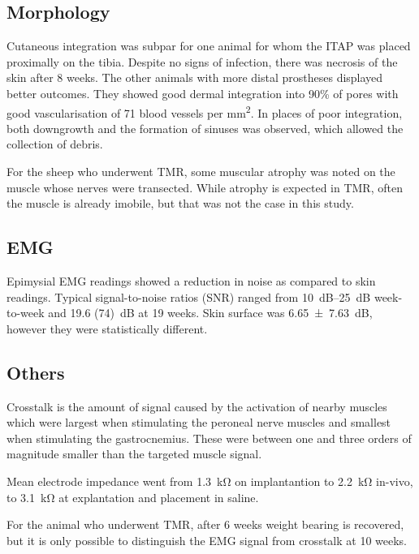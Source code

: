 \subsection{Morphology}
Cutaneous integration was subpar for one animal for whom the ITAP was placed proximally on the tibia.
Despite no signs of infection, there was necrosis of the skin after 8 weeks.
The other animals with more distal prostheses displayed better outcomes.
They showed good dermal integration into 90\% of pores with good vascularisation of 71 blood vessels per \si{\milli\metre\squared}.
In places of poor integration, both downgrowth and the formation of sinuses was observed, which allowed the collection of debris.

For the sheep who underwent TMR, some muscular atrophy was noted on the muscle whose nerves were transected. While atrophy is expected in TMR, often the muscle is already imobile, but that was not the case in this study.

\subsection{EMG}
Epimysial EMG readings showed a reduction in noise as compared to skin readings. Typical signal-to-noise ratios (SNR) ranged from \SIrange{10}{25}{\deci\bel} week-to-week and \SI{19.6 (74)}{\deci\bel} at 19 weeks.
Skin surface was \SI{6.65(763)}{\deci\bel}, however they were statistically different.

\subsection{Others}
Crosstalk is the amount of signal caused by the activation of nearby muscles which were largest when stimulating the peroneal nerve muscles and smallest when stimulating the gastrocnemius.
These were between one and three orders of magnitude smaller than the targeted muscle signal.

Mean electrode impedance went from \SI{1.3}{\kilo\ohm} on implantantion to \SI{2.2}{\kilo\ohm} in-vivo, to \SI{3.1}{\kilo\ohm} at explantation and placement in saline.

For the animal who underwent TMR, after 6 weeks weight bearing is recovered, but it is only possible to distinguish the EMG signal from crosstalk at 10 weeks.  